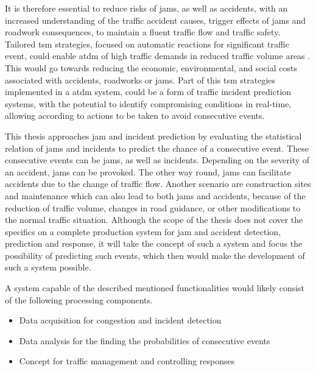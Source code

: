 \documentclass[a4paper,headsepline,footsepline,fontsize=11pt,BCOR=12mm,DIV=12]{report}
\begin{document}
It is therefore essential to reduce risks of \glspl{jam}, as well as accidents, with an increased understanding of the traffic accident causes, trigger effects of \glspl{jam} and roadwork consequences, to maintain a fluent traffic flow and traffic safety. Tailored \acrfull{tsm} strategies, focused on automatic reactions for significant traffic event, could enable \acrfull{atdm} of high traffic demands in reduced traffic volume areas \cite{Tang2019}. This would go towards reducing the economic, environmental, and social costs associated with accidents, roadworks or \glspl{jam}. Part of this \acrshort{tsm} strategies implemented in a \acrshort{atdm} system, could be a form of traffic incident prediction systems, with the potential to identify compromising conditions in real-time, allowing according to actions to be taken to avoid consecutive events. \cite{RetallackOstendorf2019} 

\bigskip

This thesis approaches \gls{jam} and incident prediction by evaluating the statistical relation of \glspl{jam} and incidents to predict the chance of a consecutive event. These consecutive events can be \glspl{jam}, as well as incidents. Depending on the severity of an accident, \glspl{jam} can be provoked. The other way round, \glspl{jam} can facilitate accidents due to the change of traffic flow. Another scenario are construction sites and maintenance which can also lead to both \glspl{jam} and accidents, because of the reduction of traffic volume, changes in road guidance, or other modifications to the normal traffic situation. Although the scope of the thesis does not cover the specifics on a complete production system for \gls{jam} and accident detection, prediction and response, it will take the concept of such a system and focus the possibility of predicting such events, which then would make the development of such a system possible. 

A system capable of the described mentioned functionalities would likely consist of the following processing components.

\begin{itemize}
  \item Data acquisition for congestion and incident detection
  \item Data analysis for the finding the probabilities of consecutive events
  \item Concept for traffic management and controlling responses
\end{itemize}
\end{document}
